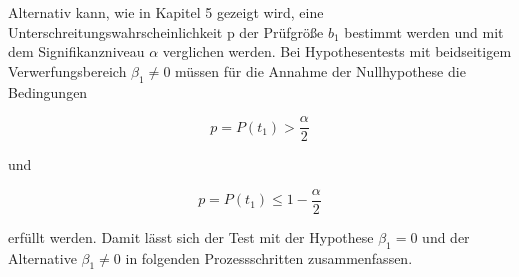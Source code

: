 \noindent Alternativ kann, wie in Kapitel 5 gezeigt wird, eine Unterschreitungswahrscheinlichkeit p der Pr\"{u}fgr\"{o}{\ss}e $b_{1}$ bestimmt werden und mit dem Signifikanzniveau $\alpha$ verglichen werden. Bei Hypothesentests mit beidseitigem Verwerfungsbereich $\beta_{1} \neq 0$  m\"{u}ssen f\"{u}r die Annahme der Nullhypothese die Bedingungen

\begin{equation}\label{eq:twelvefiftyfive}
p=P(t_{1})>\dfrac{\alpha }{2}
\end{equation}

\noindent und

\begin{equation}\label{eq:twelvefiftysix}
p=P(t_{1})\le 1-\dfrac{\alpha }{2}
\end{equation}

\noindent erf\"{u}llt werden. Damit l\"{a}sst sich der Test mit der Hypothese $\beta_{1} = 0$ und der Alternative $\beta_{1} \neq 0$  in folgenden Prozessschritten zusammenfassen.

\clearpage

